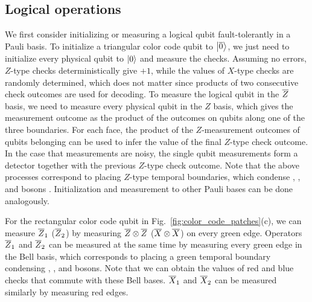 \documentclass[
 prx,
 reprint,
 superscriptaddress,
 longbibliography,
 dvipsnames
]{revtex4-2}
\begin{document}


\subsection{Logical operations \label{subsec:logical_operations}}

We first consider initializing or measuring a logical qubit fault-tolerantly in a Pauli basis.
To initialize a triangular color code qubit to $\ket{\overline{0}}$, we just need to initialize every physical qubit to $\ket{0}$ and measure the checks.
Assuming no errors, $Z$-type checks deterministically give $+1$, while the values of $X$-type checks are randomly determined, which does not matter since products of two consecutive check outcomes are used for decoding.
To measure the logical qubit in the $\overline{Z}$ basis, we need to measure every physical qubit in the $Z$ basis, which gives the measurement outcome as the product of the outcomes on qubits along one of the three boundaries.
For each face, the product of the $Z$-measurement outcomes of qubits belonging can be used to infer the value of the final $Z$-type check outcome. In the case that measurements are noisy, the single qubit measurements form a detector together with the previous $Z$-type check outcome.
Note that the above processes correspond to placing $Z$-type temporal boundaries, which condense \rz, \gz, and \bz bosons \cite{kesselring2022anyon}.
Initialization and measurement to other Pauli bases can be done analogously.

For the rectangular color code qubit in Fig.~\ref{fig:color_code_patches}(c), we can measure $\overline{Z}_1$ ($\overline{Z}_2$) by measuring $\overline{Z} \otimes \overline{Z}$ ($\overline{X} \otimes \overline{X}$) on every green edge.
Operators $\overline{Z}_1$ and $\overline{Z}_2$ can be measured at the same time by measuring every green edge in the Bell basis, which corresponds to placing a green temporal boundary condensing \gx, \gy, and \gz bosons.
Note that we can obtain the values of red and blue checks that commute with these Bell bases.
$\overline{X}_1$ and $\overline{X}_2$ can be measured similarly by measuring red edges.
\end{document}
